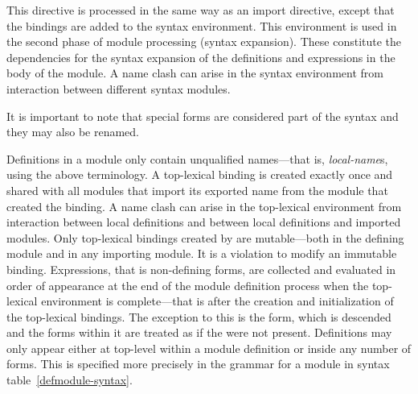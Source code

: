 %
\label{syntax-directive}
\begin{optDefinition}
This directive is processed in the same way as an import directive,
except that the bindings are added to the syntax environment.  This
environment is used in the second phase of module processing (syntax
expansion).  These constitute the dependencies for the syntax expansion
of the definitions and expressions in the body of the module.  A name
clash can arise in the syntax environment from interaction between
different syntax modules.

It is important to note that special forms are considered part of the
syntax and they may also be renamed.
\end{optDefinition}

%
\begin{optDefinition}
Definitions in a module only contain unqualified names---that is, {\em
    local-name}s, using the above terminology.  A top-lexical binding is created
exactly once and shared with all modules that import its exported name from the
module that created the binding.  A name clash can arise in the top-lexical
environment from interaction between local definitions and between local
definitions and imported modules.  Only top-lexical bindings created by
 are mutable---both in the defining module and in any
importing module.  It is a violation to modify an immutable binding.
Expressions, that is non-defining forms, are collected and evaluated in order of
appearance at the end of the module definition process when the top-lexical
environment is complete---that is after the creation and initialization of the
top-lexical bindings.  The exception to this is the  form,
which is descended and the forms within it are treated as if the
 were not present.  Definitions may only appear either at
top-level within a module definition or inside any number of 
forms.  This is specified more precisely in the grammar for a module
in syntax table~\ref{defmodule-syntax}.
%
\end{optDefinition}

